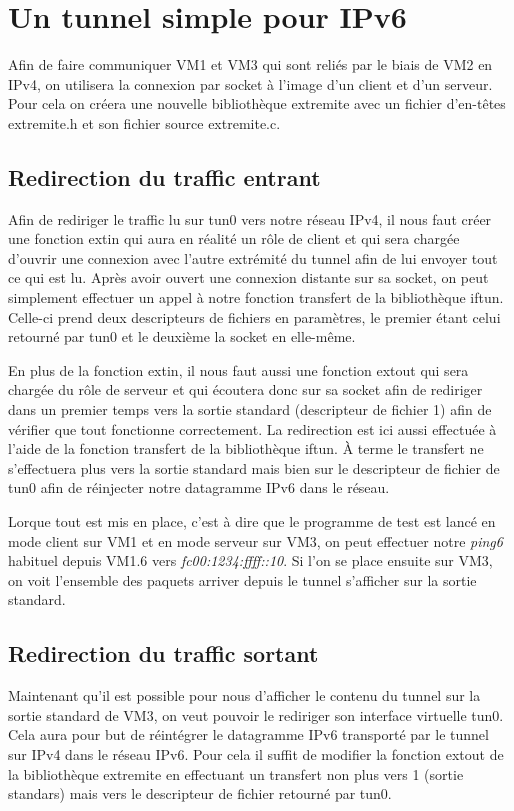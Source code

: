 \documentclass[a4paper, 12pt]{article}
\begin{document}
    \section{Un tunnel simple pour IPv6}

    Afin de faire communiquer VM1 et VM3 qui sont reliés par le biais de VM2
    en IPv4, on utilisera la connexion par socket à l'image d'un client et 
    d'un serveur. Pour cela on créera une nouvelle bibliothèque extremite avec
    un fichier d'en-têtes extremite.h et son fichier source extremite.c.

    \subsection{Redirection du traffic entrant}

    Afin de rediriger le traffic lu sur tun0 vers notre réseau IPv4, il nous
    faut créer une fonction extin qui aura en réalité un rôle de client et qui
    sera chargée d'ouvrir une connexion avec l'autre extrémité du tunnel afin
    de lui envoyer tout ce qui est lu. Après avoir ouvert une connexion 
    distante sur sa socket, on peut simplement effectuer un appel à notre 
    fonction transfert de la bibliothèque iftun. Celle-ci prend deux 
    descripteurs de fichiers en paramètres, le premier étant celui retourné par
    tun0 et le deuxième la socket en elle-même.

    \medbreak{}

    En plus de la fonction extin, il nous faut aussi une fonction extout qui 
    sera chargée du rôle de serveur et qui écoutera donc sur sa socket afin de 
    rediriger dans un premier temps vers la sortie standard (descripteur de 
    fichier 1) afin de vérifier que tout fonctionne correctement. La 
    redirection est ici aussi effectuée à l'aide de la fonction transfert de la
    bibliothèque iftun. À terme le transfert ne s'effectuera plus vers la sortie 
    standard mais bien sur le descripteur de fichier de tun0 afin de réinjecter
    notre datagramme IPv6 dans le réseau.

    \medbreak{}

    Lorque tout est  mis en place, c'est à dire que le programme de test est
    lancé en mode client sur VM1 et en mode serveur sur VM3, on peut effectuer 
    notre \textit{ping6} habituel depuis VM1.6 vers 
    \textit{fc00:1234:ffff::10}. Si l'on se place ensuite sur VM3, on voit 
    l'ensemble des paquets arriver depuis le tunnel s'afficher sur la sortie
    standard.

    \subsection{Redirection du traffic sortant}

    Maintenant qu'il est possible pour nous d'afficher le contenu du tunnel
    sur la sortie standard de VM3, on veut pouvoir le rediriger son interface
    virtuelle tun0. Cela aura pour but de réintégrer le datagramme IPv6
    transporté par le tunnel sur IPv4 dans le réseau IPv6. Pour cela il suffit
    de modifier la fonction extout de la bibliothèque extremite en effectuant
    un transfert non plus vers 1 (sortie standars) mais vers le descripteur de
    fichier retourné par tun0.
\end{document}
